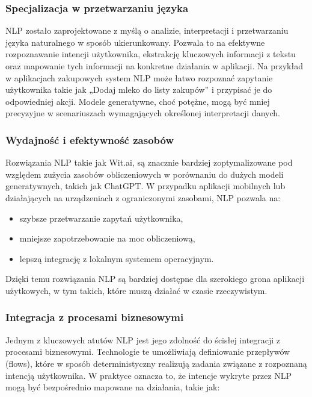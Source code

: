 \subsubsection{Specjalizacja w przetwarzaniu języka}
NLP zostało zaprojektowane z myślą o analizie, interpretacji i przetwarzaniu języka naturalnego w sposób ukierunkowany. Pozwala to na efektywne rozpoznawanie intencji użytkownika, ekstrakcję kluczowych informacji z tekstu oraz mapowanie tych informacji na konkretne działania w aplikacji. Na przykład w aplikacjach zakupowych system NLP może łatwo rozpoznać zapytanie użytkownika takie jak „Dodaj mleko do listy zakupów” i przypisać je do odpowiedniej akcji. Modele generatywne, choć potężne, mogą być mniej precyzyjne w scenariuszach wymagających określonej interpretacji danych.

\subsubsection{Wydajność i efektywność zasobów}
Rozwiązania NLP takie jak Wit.ai, są znacznie bardziej zoptymalizowane pod względem zużycia zasobów obliczeniowych w porównaniu do dużych modeli generatywnych, takich jak ChatGPT. W przypadku aplikacji mobilnych lub działających na urządzeniach z ograniczonymi zasobami, NLP pozwala na:
\begin{itemize}
    \item szybsze przetwarzanie zapytań użytkownika,
    \item mniejsze zapotrzebowanie na moc obliczeniową,
    \item lepszą integrację z lokalnym systemem operacyjnym.
\end{itemize}

Dzięki temu rozwiązania NLP są bardziej dostępne dla szerokiego grona aplikacji użytkowych, w tym takich, które muszą działać w czasie rzeczywistym.

\subsubsection{Integracja z procesami biznesowymi}

Jednym z kluczowych atutów NLP jest jego zdolność do ścisłej integracji z procesami biznesowymi. Technologie te umożliwiają definiowanie przepływów (flows), które w sposób deterministyczny realizują zadania związane z rozpoznaną intencją użytkownika. W praktyce oznacza to, że intencje wykryte przez NLP mogą być bezpośrednio mapowane na działania, takie jak:

